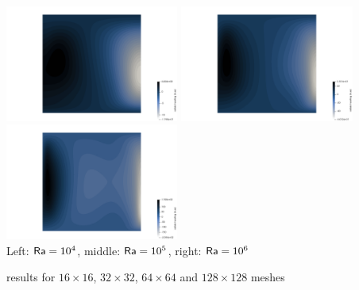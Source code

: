 \begin{center}
\includegraphics[width=5.7cm]{python_codes/fieldstone_110/results_EBA/adiab_1e4}
\includegraphics[width=5.7cm]{python_codes/fieldstone_110/results_EBA/adiab_1e5}
\includegraphics[width=5.7cm]{python_codes/fieldstone_110/results_EBA/adiab_1e6}\\
{\captionfont Left: ${\mathsf{Ra}}=10^4$, middle: ${\mathsf{Ra}}=10^5$, right: ${\mathsf{Ra}}=10^6$}
\end{center}

\newpage
\aspect results for $16\times 16$, $32\times 32$, $64\times 64$ and $128\times 128$ meshes

